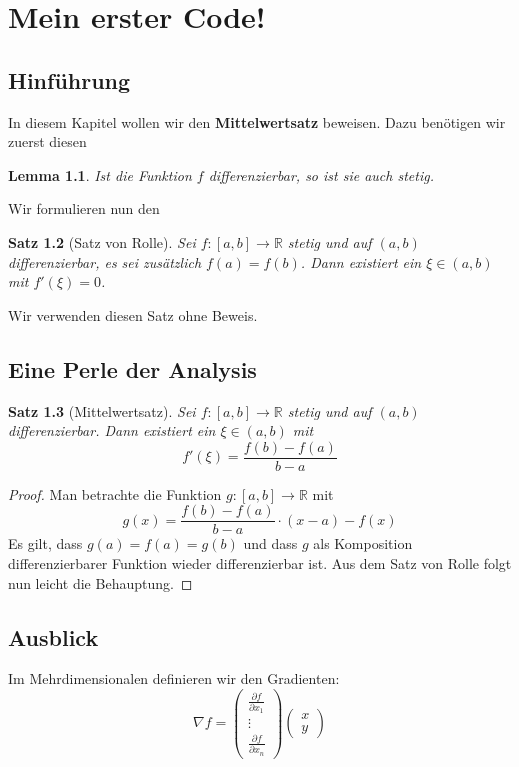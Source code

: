 \documentclass[12pt]{scrreprt}
\newtheorem{satz}{Satz}[section]
\newtheorem{lemma}[satz]{Lemma}
\theoremstyle{definition}
\theoremstyle{remark}
\newcommand{\R}{\mathbb{R}}
\begin{document}
\chapter{Mein erster Code!}

\section{Hinführung}
In diesem Kapitel wollen wir den \textbf{Mittelwertsatz} beweisen.  Dazu benötigen wir zuerst diesen

\begin{lemma}
    Ist die Funktion $f$ differenzierbar, so ist sie auch stetig.
\end{lemma}

Wir formulieren nun den

\begin{satz}[Satz von Rolle]
    Sei $f \colon [a,b] \to \R$ stetig und auf $(a,b)$ differenzierbar, es sei zusätzlich $f(a) =
    f(b)$.  Dann existiert ein $\xi \in (a,b)$ mit $f'(\xi) = 0$.
\end{satz}

Wir verwenden diesen Satz ohne Beweis.

\section{Eine Perle der Analysis}

\begin{satz}[Mittelwertsatz]
    Sei $f \colon [a,b] \to \R$ stetig und auf $(a,b)$ differenzierbar.  Dann existiert ein $\xi \in
    (a,b)$ mit
        \[ f'(\xi) = \frac{f(b)-f(a)}{b-a} \]
\end{satz}
\begin{proof}
    Man betrachte die Funktion $g \colon [a,b] \to \R$ mit
    \[ g(x) = \frac{f(b)-f(a)}{b-a} \cdot (x-a) - f(x) \]
    Es gilt, dass $g(a) = f(a) = g(b)$ und dass $g$ als Komposition differenzierbarer Funktion
    wieder differenzierbar ist.  Aus dem Satz von Rolle folgt nun leicht die Behauptung.
\end{proof}

\section{Ausblick}
Im Mehrdimensionalen definieren wir den Gradienten:
    \[ \nabla f =
        \begin{pmatrix}
            \frac{\partial f}{\partial x_1} \\
            \vdots \\
            \frac{\partial f}{\partial x_n}
        \end{pmatrix}
        \begin{pmatrix}
            x \\
            y
        \end{pmatrix}
    \]
\end{document}
